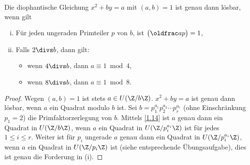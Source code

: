 \begin{st} \label{2.18}
	Die diophantische Gleichung $x^2 + by = a$ mit $(a,b) = 1$ ist genau dann lösbar, wenn gilt
	\begin{enumerate}[(i)]
		\item
			Für jeden ungeraden Primteiler $p$ von $b$, ist $\legsym ap = 1$,
		\item
			Falls $2 \divs b$, dann gilt:
			\begin{itemize}
				\item
					wenn $4 \divs b$, dann $a \equiv 1 \bmod 4$,
				\item
					wenn $8 \divs b$, dann $a \equiv 1 \bmod 8$.
			\end{itemize}
	\end{enumerate}
	\begin{proof}
		Wegen $(a,b) = 1$ ist stets $a \in U(\Z / b\Z)$.
		$x^2 + by = a$ ist genau dann lösbar, wenn $a$ ein Quadrat modulo $b$ ist.
		Sei $b = p_1^{a_1} p_2^{a_2} \dotsb p_r^{a_r}$ (ohne Einschränkung $p_1 = 2$) die Primfaktorzerlegung von $b$.
		Mittels \ref{1.14} ist $a$ genau dann ein Quadrat in $U(\Z / b\Z)$, wenn $a$ ein Quadrat in $U(\Z / p_i^{a_i}\Z)$ ist für jedes $1 \le i \le r$.
		Weiter ist für $p_i$ ungerade $a$ genau dann ein Quadrat in $U(\Z / p_i^{a_i} \Z)$, wenn $a$ ein Quadrat in $U(\Z / p_i \Z)$ ist (siehe entsprechende Übungsaufgabe), dies ist genau die Forderung in (i).


\end{proof}
\end{st}
